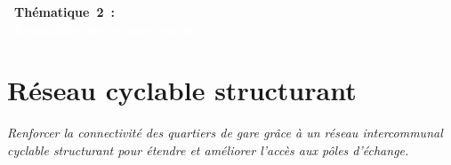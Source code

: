 \documentclass[../main.tex]{subfiles}
\begin{document}
    \newpage

    \vspace{15pt}
    \noindent
    \Large
\textbf{\textcolor{UGEblue}{~Thématique~2~:}}
    \\
\colorbox{UGEblue}{\textbf{\textcolor{white}{~Requalifier les espaces publics~}}}
    \vspace{15pt}

    \vspace{15pt}
\section{Réseau cyclable structurant}

\begin{block}[Développer]
    \linespread{0.9}\selectfont %
    \textit{\small{Renforcer la connectivité des quartiers de gare grâce à un réseau intercommunal cyclable structurant pour étendre et améliorer l'accès aux pôles d'échange.}}
\end{block}
\end{document}
